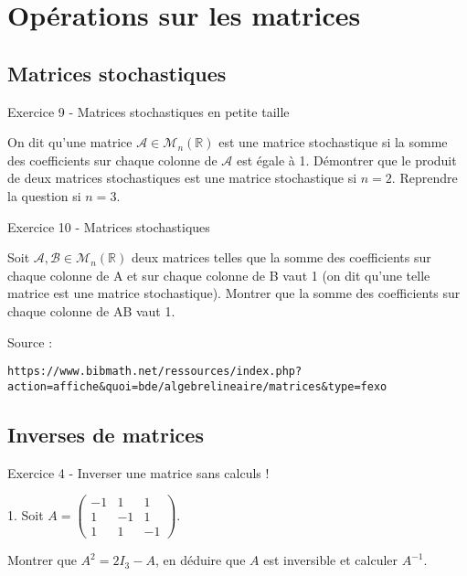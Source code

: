 \newpage
\section{Opérations sur les matrices}
\subsection{Matrices stochastiques}

Exercice 9 - Matrices stochastiques en petite taille

On dit qu'une matrice $\mathcal{A}∈\mathcal{M}_n(\mathbb{R})$ est une matrice stochastique si la somme des coefficients sur chaque colonne de $\mathcal{A}$ est égale à 1. Démontrer que le produit de deux matrices stochastiques est une matrice stochastique si $n=2$. Reprendre la question si $n=3$.

\vspace{.323cm}
Exercice 10 - Matrices stochastiques

Soit $\mathcal{A},\mathcal{B}∈\mathcal{M}_n(\mathbb{R})$ deux matrices telles que la somme des coefficients sur chaque colonne de A et sur chaque colonne de B vaut 1 (on dit qu'une telle matrice est une matrice stochastique). Montrer que la somme des coefficients sur chaque colonne de AB vaut 1.

\vspace{.323cm}
{\scriptsize Source : 

\texttt{https://www.bibmath.net/ressources/index.php?action=affiche\&quoi=bde/algebrelineaire/matrices\&type=fexo}}

\subsection{Inverses de matrices}

Exercice 4 - Inverser une matrice sans calculs !
\vspace{.323cm}

\begin{minipage}[c]{.45\linewidth}
1. Soit $ A=\left(
\begin{array}{ccc}
-1&1&1\\1&-1&1\\1&1&-1
\end{array}\right)$.
\end{minipage}
\hfill
\begin{minipage}[c]{.45\linewidth}
Montrer que $A^2=2I_3-A$, en déduire que $A$ est inversible et calculer $A^{-1}$.
\end{minipage}


